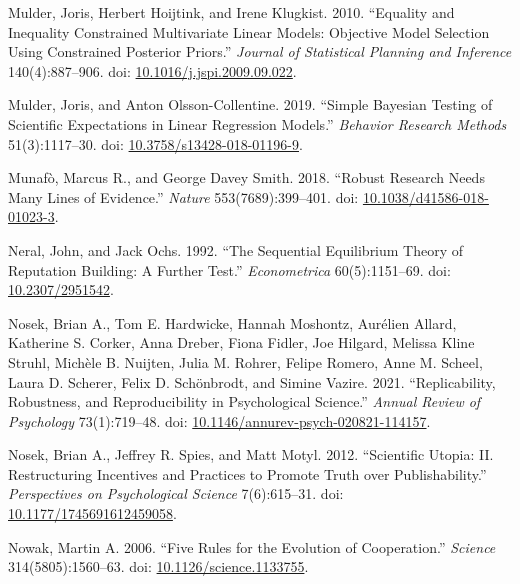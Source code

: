 \documentclass[
  11pt,
]{article}
\newlength{\cslhangindent}
\newlength{\cslentryspacingunit} %
\newenvironment{CSLReferences}[2] %
 {%
  \setlength{\parindent}{0pt}
  \ifodd #1
  \let\oldpar\par
  \def\par{\hangindent=\cslhangindent\oldpar}
  \fi
  \setlength{\parskip}{#2\cslentryspacingunit}
 }%
 {}
\begin{document}
\begin{CSLReferences}{1}{0}
\leavevmode{}%
Mulder, Joris, Herbert Hoijtink, and Irene Klugkist. 2010. {``Equality and Inequality Constrained Multivariate Linear Models: Objective Model Selection Using Constrained Posterior Priors.''} \emph{Journal of Statistical Planning and Inference} 140(4):887--906. doi: \href{https://doi.org/10.1016/j.jspi.2009.09.022}{10.1016/j.jspi.2009.09.022}.

\leavevmode{}%
Mulder, Joris, and Anton Olsson-Collentine. 2019. {``Simple Bayesian Testing of Scientific Expectations in Linear Regression Models.''} \emph{Behavior Research Methods} 51(3):1117--30. doi: \href{https://doi.org/10.3758/s13428-018-01196-9}{10.3758/s13428-018-01196-9}.

\leavevmode{}%
Munafò, Marcus R., and George Davey Smith. 2018. {``Robust Research Needs Many Lines of Evidence.''} \emph{Nature} 553(7689):399--401. doi: \href{https://doi.org/10.1038/d41586-018-01023-3}{10.1038/d41586-018-01023-3}.

\leavevmode{}%
Neral, John, and Jack Ochs. 1992. {``The Sequential Equilibrium Theory of Reputation Building: A Further Test.''} \emph{Econometrica} 60(5):1151--69. doi: \href{https://doi.org/10.2307/2951542}{10.2307/2951542}.

\leavevmode{}%
Nosek, Brian A., Tom E. Hardwicke, Hannah Moshontz, Aurélien Allard, Katherine S. Corker, Anna Dreber, Fiona Fidler, Joe Hilgard, Melissa Kline Struhl, Michèle B. Nuijten, Julia M. Rohrer, Felipe Romero, Anne M. Scheel, Laura D. Scherer, Felix D. Schönbrodt, and Simine Vazire. 2021. {``Replicability, Robustness, and Reproducibility in Psychological Science.''} \emph{Annual Review of Psychology} 73(1):719--48. doi: \href{https://doi.org/10.1146/annurev-psych-020821-114157}{10.1146/annurev-psych-020821-114157}.

\leavevmode{}%
Nosek, Brian A., Jeffrey R. Spies, and Matt Motyl. 2012. {``Scientific Utopia: II. Restructuring Incentives and Practices to Promote Truth over Publishability.''} \emph{Perspectives on Psychological Science} 7(6):615--31. doi: \href{https://doi.org/10.1177/1745691612459058}{10.1177/1745691612459058}.

\leavevmode{}%
Nowak, Martin A. 2006. {``Five Rules for the Evolution of Cooperation.''} \emph{Science} 314(5805):1560--63. doi: \href{https://doi.org/10.1126/science.1133755}{10.1126/science.1133755}.


\end{CSLReferences}
\end{document}
